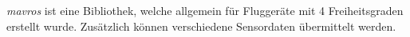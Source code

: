 


















\textit{mavros} ist eine Bibliothek, welche allgemein für Fluggeräte mit 4 Freiheitsgraden erstellt wurde. Zusätzlich können verschiedene Sensordaten übermittelt werden.















